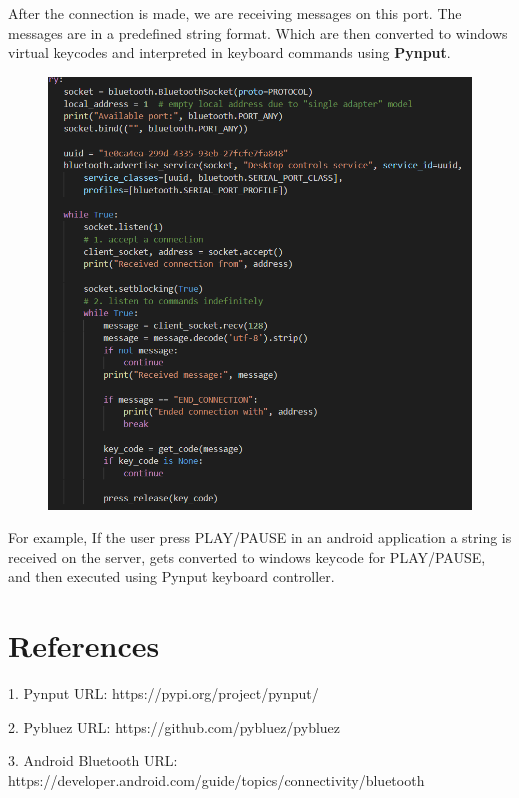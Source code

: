 \documentclass{article}
\begin{document}
After the connection is made, we are receiving messages on this port. The messages are in a
predefined string format. Which are then converted to windows virtual keycodes and interpreted in
keyboard commands using \textbf{Pynput}.

\begin{figure}[ht]
\centering
\includegraphics[scale=.5]{./socket.png}
\end{figure}

For example, If the user press PLAY/PAUSE in an android application a string is received on the
server, gets converted to windows keycode for PLAY/PAUSE, and then executed using Pynput keyboard
controller.


\section{References}

1. Pynput  URL: https://pypi.org/project/pynput/

2. Pybluez URL: https://github.com/pybluez/pybluez

3. Android Bluetooth URL: https://developer.android.com/guide/topics/connectivity/bluetooth
\end{document}
